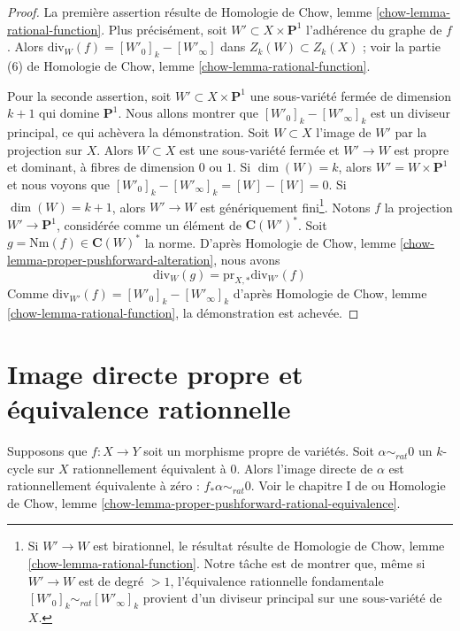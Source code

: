 \begin{proof}
La première assertion résulte de
Homologie de Chow, lemme \ref{chow-lemma-rational-function}.
Plus précisément, soit $W' \subset X \times \mathbf{P}^1$ l'adhérence
du graphe de $f$. Alors $\text{div}_W(f) = [W'_0]_k - [W'_\infty]$
dans $Z_k(W) \subset Z_k(X)$ ; voir la partie (6) de
Homologie de Chow, lemme \ref{chow-lemma-rational-function}.

\medskip\noindent
Pour la seconde assertion, soit $W' \subset X \times \mathbf{P}^1$ une sous-variété
fermée de dimension $k + 1$ qui domine $\mathbf{P}^1$.
Nous allons montrer que $[W'_0]_k - [W'_\infty]_k$ est un diviseur principal,
ce qui achèvera la démonstration. Soit $W \subset X$ l'image de $W'$
par la projection sur $X$. Alors $W \subset X$ est une sous-variété fermée
et $W' \to W$ est propre et dominant, à fibres de dimension $0$
ou $1$. Si $\dim(W) = k$, alors $W' = W \times \mathbf{P}^1$ et nous
voyons que $[W'_0]_k - [W'_\infty]_k = [W] - [W] = 0$.
Si $\dim(W) = k + 1$, alors
$W' \to W$ est génériquement fini\footnote{Si $W' \to W$ est birationnel,
le résultat résulte de
Homologie de Chow, lemme \ref{chow-lemma-rational-function}.
Notre tâche est de montrer que, même si $W' \to W$
est de degré $> 1$, l'équivalence rationnelle fondamentale
$[W'_0]_k \sim_{rat} [W'_\infty]_k$ provient d'un diviseur principal
sur une sous-variété de $X$.}. Notons $f$ la projection $W' \to \mathbf{P}^1$,
considérée comme un élément de $\mathbf{C}(W')^*$. Soit
$g = \text{Nm}(f) \in \mathbf{C}(W)^*$ la norme. D'après
Homologie de Chow, lemme \ref{chow-lemma-proper-pushforward-alteration},
nous avons
$$
\text{div}_W(g) = \text{pr}_{X, *}\text{div}_{W'}(f)
$$
Comme $\text{div}_{W'}(f) = [W'_0]_k - [W'_\infty]_k$
d'après Homologie de Chow, lemme \ref{chow-lemma-rational-function},
la démonstration est achevée.
\end{proof}


\section{Image directe propre et équivalence rationnelle}
\label{section-pushforward-and-rational-equivalence}

\noindent
Supposons que $f : X \to Y$ soit un morphisme propre de variétés.
Soit $\alpha \sim_{rat} 0$ un $k$-cycle sur
$X$ rationnellement équivalent à $0$. Alors l'{image directe}
de $\alpha$ est rationnellement équivalente à zéro :
$f_* \alpha \sim_{rat} 0$. Voir le chapitre I de \cite{F} ou
Homologie de Chow, lemme \ref{chow-lemma-proper-pushforward-rational-equivalence}.

